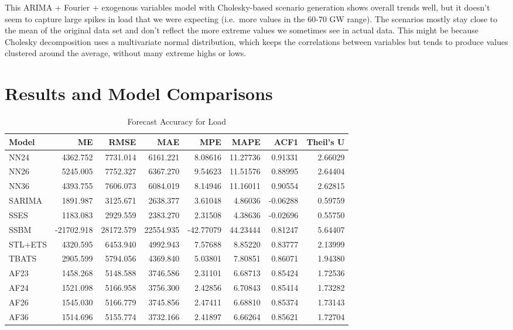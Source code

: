 \documentclass[
]{article}
\begin{document}
This ARIMA + Fourier + exogenous variables model with Cholesky-based
scenario generation shows overall trends well, but it doesn't seem to
capture large spikes in load that we were expecting (i.e.~more values in
the 60-70 GW range). The scenarios mostly stay close to the mean of the
original data set and don't reflect the more extreme values we sometimes
see in actual data. This might be because Cholesky decomposition uses a
multivariate normal distribution, which keeps the correlations between
variables but tends to produce values clustered around the average,
without many extreme highs or lows.

\newpage

\section{Results and Model
Comparisons}\label{results-and-model-comparisons}

\begin{table}[!h]
\centering
\caption{\label{tab:unnamed-chunk-24}Forecast Accuracy for Load}
\centering
\begin{tabular}[t]{l|r|r|r|r|r|r|r}
\hline
Model & ME & RMSE & MAE & MPE & MAPE & ACF1 & Theil's U\\
\hline
NN24 & 4362.752 & 7731.014 & 6161.221 & 8.08616 & 11.27736 & 0.91331 & 2.66029\\
\hline
NN26 & 5245.005 & 7752.327 & 6367.270 & 9.54623 & 11.51576 & 0.88995 & 2.64404\\
\hline
NN36 & 4393.755 & 7606.073 & 6084.019 & 8.14946 & 11.16011 & 0.90554 & 2.62815\\
\hline
SARIMA & 1891.987 & 3125.671 & 2638.377 & 3.61048 & 4.86036 & -0.06288 & 0.59759\\
\hline
SSES & 1183.083 & 2929.559 & 2383.270 & 2.31508 & 4.38636 & -0.02696 & 0.55750\\
\hline
SSBM & -21702.918 & 28172.579 & 22554.935 & -42.77079 & 44.23444 & 0.81247 & 5.64407\\
\hline
STL+ETS & 4320.595 & 6453.940 & 4992.943 & 7.57688 & 8.85220 & 0.83777 & 2.13999\\
\hline
TBATS & 2905.599 & 5794.056 & 4369.840 & 5.03801 & 7.80851 & 0.86071 & 1.94380\\
\hline
AF23 & 1458.268 & 5148.588 & 3746.586 & 2.31101 & 6.68713 & 0.85424 & 1.72536\\
\hline
AF24 & 1521.098 & 5166.958 & 3756.300 & 2.42856 & 6.70843 & 0.85414 & 1.73282\\
\hline
AF26 & 1545.030 & 5166.779 & 3745.856 & 2.47411 & 6.68810 & 0.85374 & 1.73143\\
\hline
AF36 & 1514.696 & 5155.774 & 3732.166 & 2.41897 & 6.66264 & 0.85621 & 1.72704\\
\hline
\end{tabular}
\end{table}
\end{document}
